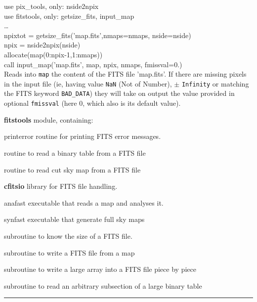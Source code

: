 \begin{example}
{
use pix\_tools, only: nside2npix \\
use fitstools, only: getsize\_fits, input\_map \\
\ldots \\
npixtot = getsize\_fits('map.fits',nmaps=nmaps, nside=nside) \\
npix = nside2npix(nside) \\
allocate(map(0:npix-1,1:nmaps)) \\
call input\_map('map.fits', map, npix, nmaps, fmissval=0.)  \\
}
{
Reads into {\tt map} the content of the FITS file 'map.fits'.
If there are
missing pixels in the input file (ie, having value {\tt NaN} (Not of Number),
$\pm$ {\tt Infinity} or matching the FITS keyword {\tt BAD\_DATA}) they will
take on output the value provided in optional {\tt fmissval} (here 0, which also
is its default value).
}
\end{example}
\begin{modules}
  \begin{sulist}{} %
  \item[\textbf{fitstools}] module, containing:
  \item[printerror] routine for printing FITS error messages.
  \item[\htmlref{read\_bintab}{sub:read_bintab}] routine to read a binary table
  from a FITS file
  \item[\htmlref{read\_fits\_cut4}{sub:read_fits_cut4}] routine to read cut sky
  map from a FITS file
  \item[\textbf{cfitsio}] library for FITS file handling.
  \end{sulist}
\end{modules}

\begin{related}
  \begin{sulist}{} %
  \item[anafast] executable that reads a \healpix map and analyses it. 
  \item[synfast] executable that generate full sky \healpix maps
  \item[\htmlref{getsize\_fits}{sub:getsize_fits}] subroutine to know the size of a FITS file.
  \item[\htmlref{output\_map}{sub:output_map}] subroutine to write a FITS file
  from a \healpix map
  \item[\htmlref{write\_bintabh}{sub:write_bintabh}] subroutine to write a large
  array into a FITS file piece by piece
  \item[\htmlref{input\_tod*}{sub:input_tod}] subroutine to read an arbitrary subsection of
  a large binary table
  \end{sulist}
\end{related}

\rule{\hsize}{2mm}

\newpage
